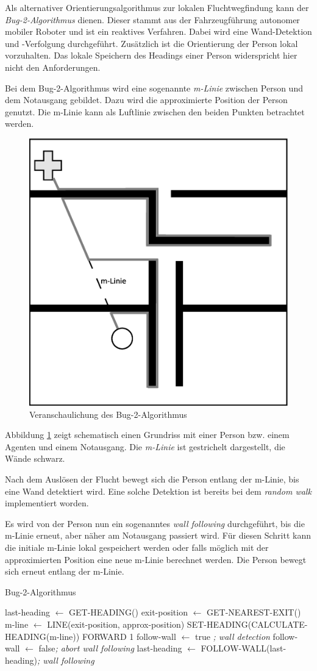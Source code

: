 Als alternativer Orientierungsalgorithmus zur lokalen Fluchtwegfindung kann der \emph{Bug-2-Algorithmus} dienen. Dieser stammt aus der Fahrzeugführung autonomer mobiler Roboter und ist ein reaktives Verfahren.
Dabei wird eine Wand-Detektion und -Verfolgung durchgeführt. Zusätzlich ist die Orientierung der Person lokal vorzuhalten. Das lokale Speichern des Headings einer Person widerspricht hier nicht den Anforderungen.

Bei dem Bug-2-Algorithmus wird eine sogenannte \emph{m-Linie} zwischen Person und dem Notausgang gebildet. Dazu wird die approximierte Position der Person genutzt. Die m-Linie kann als Luftlinie zwischen den beiden Punkten betrachtet werden.

\begin{figure}[!ht]
\centering
\includegraphics[height=0.35\textwidth]{evaluation/bug_2}
\caption{Veranschaulichung des Bug-2-Algorithmus}
\label{fig:bug_2}
\end{figure}

Abbildung \ref{fig:bug_2} zeigt schematisch einen Grundriss mit einer Person bzw. einem Agenten und einem Notausgang. Die \emph{m-Linie} ist gestrichelt dargestellt, die Wände schwarz.

Nach dem Auslösen der Flucht bewegt sich die Person entlang der m-Linie, bis eine Wand detektiert wird. Eine solche Detektion ist bereits bei dem \emph{random walk} implementiert worden. 

Es wird von der Person nun ein sogenanntes \emph{wall following} durchgeführt, bis die m-Linie erneut, aber näher am Notausgang passiert wird. Für diesen Schritt kann die initiale m-Linie lokal gespeichert werden oder falls möglich mit der approximierten Position eine neue m-Linie berechnet werden. Die Person bewegt sich erneut entlang der m-Linie.



\begin{algorithm}
\caption{Bug-2-Algorithmus}
\label{alg:bug_2}
\begin{algorithmic} 
\STATE last-heading $\leftarrow$ GET-HEADING()
\STATE exit-position $\leftarrow$ GET-NEAREST-EXIT()
\STATE m-line $\leftarrow$ LINE(exit-position, approx-position)
\STATE SET-HEADING(CALCULATE-HEADING(m-line))
\STATE FORWARD 1
\ELSE
\STATE follow-wall $\leftarrow$ true \hfill\emph{; wall detection}
\ENDIF
{}
\STATE follow-wall $\leftarrow$ false\hfill\emph{; abort wall following}
\ELSE
\STATE last-heading $\leftarrow$ FOLLOW-WALL(last-heading)\hfill\emph{; wall following}
\ENDIF
\ENDWHILE
\ENDWHILE
\end{algorithmic}
\end{algorithm}


